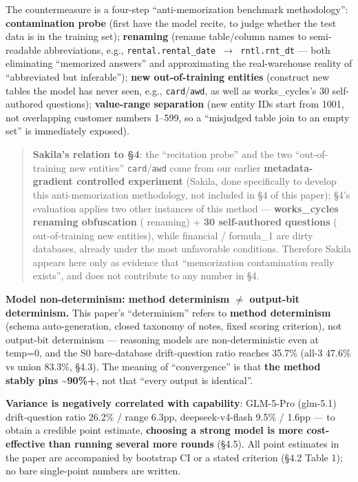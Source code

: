 \documentclass[11pt]{article}
\begin{document}
The countermeasure is a four-step ``anti-memorization benchmark methodology'': \textbf{ contamination probe} (first have the model recite, to judge whether the test data is in the training set); \textbf{ renaming} (rename table/column names to semi-readable abbreviations, e.g., \texttt{rental.rental\_date\ $\rightarrow$\ rntl.rnt\_dt} --- both eliminating ``memorized answers'' and approximating the real-warehouse reality of ``abbreviated but inferable''); \textbf{ new out-of-training entities} (construct new tables the model has never seen, e.g., \texttt{card}/\texttt{awd}, as well as works\_cycles's 30 self-authored questions); \textbf{ value-range separation} (new entity IDs start from 1001, not overlapping customer numbers 1--599, so a ``misjudged table join to an empty set'' is immediately exposed).

\begin{quote}
\textbf{Sakila's relation to \S{}4}: the ``recitation probe'' and the two ``out-of-training new entities'' \texttt{card}/\texttt{awd} come from our earlier \textbf{metadata-gradient controlled experiment} (Sakila, done specifically to develop this anti-memorization methodology, not included in \S{}4 of this paper); \S{}4's evaluation applies two other instances of this method --- \textbf{works\_cycles renaming obfuscation} ( renaming) + \textbf{30 self-authored questions} ( out-of-training new entities), while financial / formula\_1 are dirty databases, already under the most unfavorable conditions. Therefore Sakila appears here only as evidence that ``memorization contamination really exists'', and does not contribute to any number in \S{}4.
\end{quote}

\textbf{ Model non-determinism: method determinism $\neq$ output-bit determinism.} This paper's ``determinism'' refers to \textbf{method determinism} (schema auto-generation, closed taxonomy of notes, fixed scoring criterion), not output-bit determinism --- reasoning models are non-deterministic even at temp=0, and the S0 bare-database drift-question ratio reaches 35.7\% (all-3 47.6\% vs union 83.3\%, \S{}4.3). The meaning of ``convergence'' is that \textbf{the method stably pins \textasciitilde90\%+}, not that ``every output is identical''.

\textbf{Variance is negatively correlated with capability}: GLM-5-Pro (glm-5.1) drift-question ratio 26.2\% / range 6.3pp, deepseek-v4-flash 9.5\% / 1.6pp --- to obtain a credible point estimate, \textbf{choosing a strong model is more cost-effective than running several more rounds} (\S{}4.5). All point estimates in the paper are accompanied by bootstrap CI or a stated criterion (\S{}4.2 Table 1); no bare single-point numbers are written.
\end{document}
